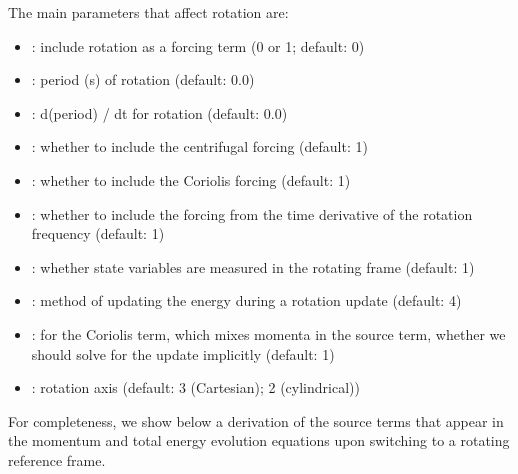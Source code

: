 The main parameters that affect rotation are:
\begin{itemize}

\item {} : include rotation as a forcing
  term (0 or 1; default: 0)

\item {} : period (s) of rotation
  (default: 0.0)

\item {} : d(period) / dt for rotation
  (default: 0.0)

\item {} : whether to
  include the centrifugal forcing (default: 1)

\item {} : whether to
  include the Coriolis forcing (default: 1)

\item {} : whether to
  include the forcing from the time derivative of the rotation
  frequency (default: 1)

\item {} : whether state
  variables are measured in the rotating frame (default: 1)

\item {} : method of updating the
  energy during a rotation update (default: 4)

\item {} : for the Coriolis
  term, which mixes momenta in the source term, whether we should
  solve for the update implicitly (default: 1)

\item {} : rotation axis (default: 3
  (Cartesian); 2 (cylindrical))

\end{itemize}

For completeness, we show below a derivation of the source terms that
appear in the momentum and total energy evolution equations upon
switching to a rotating reference frame.


